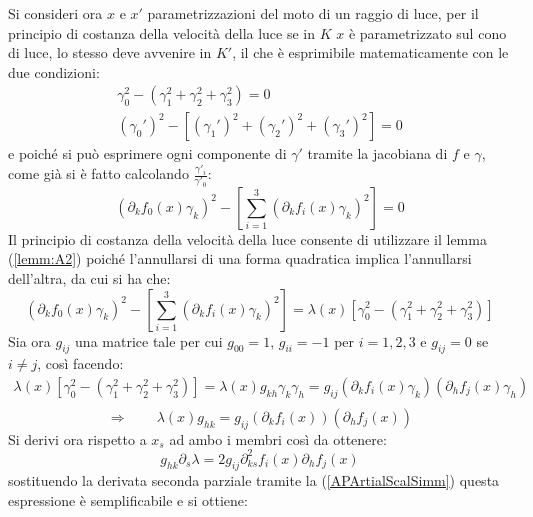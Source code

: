 Si consideri ora $x$ e $x'$ parametrizzazioni del moto di un raggio di luce, per il principio di costanza della velocità della luce se in $K$ $x$ è parametrizzato sul cono di luce, lo stesso deve avvenire in $K'$, il che è esprimibile matematicamente con le due condizioni:
\begin{equation*}
    \begin{gathered}
        \gamma_0^2-(\gamma_1^2+\gamma_2^2+\gamma_3^2)=0\\
        (\gamma_0')^2-[(\gamma_1')^2+(\gamma_2')^2+(\gamma_3')^2]=0
    \end{gathered}
\end{equation*}
e poiché si può esprimere ogni componente di $\gamma'$ tramite la jacobiana di $f$ e $\gamma$, come già si è fatto calcolando $\frac{\gamma'_i}{\gamma'_0}$:
\begin{equation*}
    \left(\partial_kf_0(x)\gamma_k\right)^2-\left[\sum_{i=1}^3\left(\partial_kf_i(x)\gamma_k\right)^2\right]=0
\end{equation*}
Il principio di costanza della velocità della luce consente di utilizzare il lemma (\ref{lemm:A2}) poiché l'annullarsi di una forma quadratica implica l'annullarsi dell'altra, da cui si ha che:
\begin{equation*}
    \left(\partial_kf_0(x)\gamma_k\right)^2-\left[\sum_{i=1}^3\left(\partial_kf_i(x)\gamma_k\right)^2\right]=
    \lambda(x)\left[\gamma_0^2-(\gamma_1^2+\gamma_2^2+\gamma_3^2)\right]
\end{equation*}
Sia ora $g_{ij}$ una matrice tale per cui $g_{00}=1$, $g_{ii}=-1$ per $i=1,2,3$ e $g_{ij}=0$ se $i\neq j$, così facendo:
\begin{equation*}
    \begin{gathered}
        \lambda(x)\left[\gamma_0^2-(\gamma_1^2+\gamma_2^2+\gamma_3^2)\right]= 
        \lambda(x)g_{kh}\gamma_k\gamma_h=g_{ij}(\partial_kf_i(x)\gamma_k)(\partial_hf_j(x)\gamma_h)\\
    \end{gathered}
\end{equation*}
\begin{equation}
   \Rightarrow\qquad \lambda(x)g_{hk}=g_{ij}(\partial_kf_i(x))(\partial_hf_j(x))
    \label{APartialDelta}
\end{equation}
Si derivi ora rispetto a $x_s $ ad ambo i membri così da ottenere:
\begin{equation*}
    g_{hk} \partial_s\lambda =2g_{ij}\partial_{ks}^2f_i(x)\partial_hf_j(x)
\end{equation*}
sostituendo la derivata seconda parziale tramite la (\ref{APArtialScalSimm}) questa espressione è semplificabile e si ottiene:
